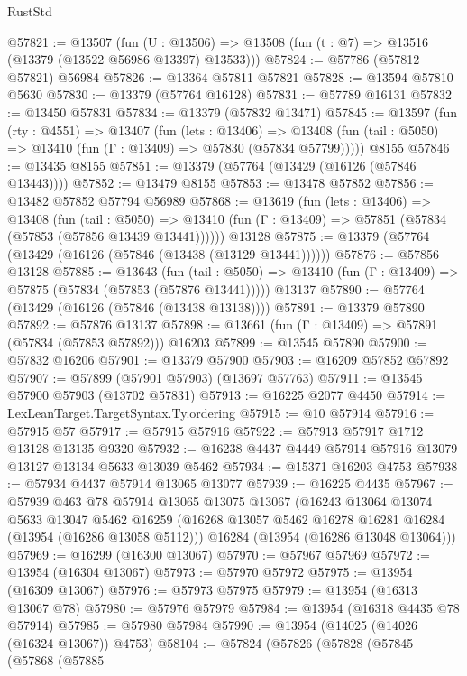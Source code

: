 \begin{lexlean}{RustStd}
\begin{coremodule}
@57821 := @13507
    (fun (U : @13506) => @13508 (fun (t : @7) => @13516 (@13379 (@13522 @56986 @13397) @13533)))
@57824 := @57786 (@57812 @57821) @56984
@57826 := @13364 @57811 @57821
@57828 := @13594 @57810 @5630
@57830 := @13379 (@57764 @16128)
@57831 := @57789 @16131
@57832 := @13450 @57831
@57834 := @13379 (@57832 @13471)
@57845 := @13597
    (fun (rty : @4551) =>
    @13407
      (fun (lets : @13406) =>
      @13408 (fun (tail : @5050) => @13410 (fun (Γ : @13409) => @57830 (@57834 @57799)))))
    @8155
@57846 := @13435 @8155
@57851 := @13379 (@57764 (@13429 (@16126 (@57846 @13443))))
@57852 := @13479 @8155
@57853 := @13478 @57852
@57856 := @13482 @57852 @57794 @56989
@57868 := @13619
    (fun (lets : @13406) =>
    @13408
      (fun (tail : @5050) =>
      @13410 (fun (Γ : @13409) => @57851 (@57834 (@57853 (@57856 @13439 @13441))))))
    @13128
@57875 := @13379 (@57764 (@13429 (@16126 (@57846 (@13438 (@13129 @13441))))))
@57876 := @57856 @13128
@57885 := @13643
    (fun (tail : @5050) => @13410 (fun (Γ : @13409) => @57875 (@57834 (@57853 (@57876 @13441)))))
    @13137
@57890 := @57764 (@13429 (@16126 (@57846 (@13438 @13138))))
@57891 := @13379 @57890
@57892 := @57876 @13137
@57898 := @13661 (fun (Γ : @13409) => @57891 (@57834 (@57853 @57892))) @16203
@57899 := @13545 @57890
@57900 := @57832 @16206
@57901 := @13379 @57900
@57903 := @16209 @57852 @57892
@57907 := @57899 (@57901 @57903) (@13697 @57763)
@57911 := @13545 @57900 @57903 (@13702 @57831)
@57913 := @16225 @2077 @4450
@57914 := LexLeanTarget.TargetSyntax.Ty.ordering
@57915 := @10 @57914
@57916 := @57915 @57
@57917 := @57915 @57916
@57922 := @57913 @57917 @1712 @13128 @13135 @9320
@57932 := @16238 @4437 @4449 @57914 @57916 @13079 @13127 @13134 @5633 @13039 @5462
@57934 := @15371 @16203 @4753
@57938 := @57934 @4437 @57914 @13065 @13077
@57939 := @16225 @4435
@57967 := @57939
    @463
    @78
    @57914
    @13065
    @13075
    @13067
    (@16243
      @13064
      @13074
      @5633
      @13047
      @5462
      @16259
      (@16268 @13057 @5462 @16278 @16281 @16284 (@13954 (@16286 @13058 @5112)))
      @16284
      (@13954 (@16286 @13048 @13064)))
@57969 := @16299 (@16300 @13067)
@57970 := @57967 @57969
@57972 := @13954 (@16304 @13067)
@57973 := @57970 @57972
@57975 := @13954 (@16309 @13067)
@57976 := @57973 @57975
@57979 := @13954 (@16313 @13067 @78)
@57980 := @57976 @57979
@57984 := @13954 (@16318 @4435 @78 @57914)
@57985 := @57980 @57984
@57990 := @13954 (@14025 (@14026 (@16324 @13067)) @4753)
@58104 := @57824
    (@57826
      (@57828
        (@57845
          (@57868
            (@57885

\end{coremodule}
\end{lexlean}
